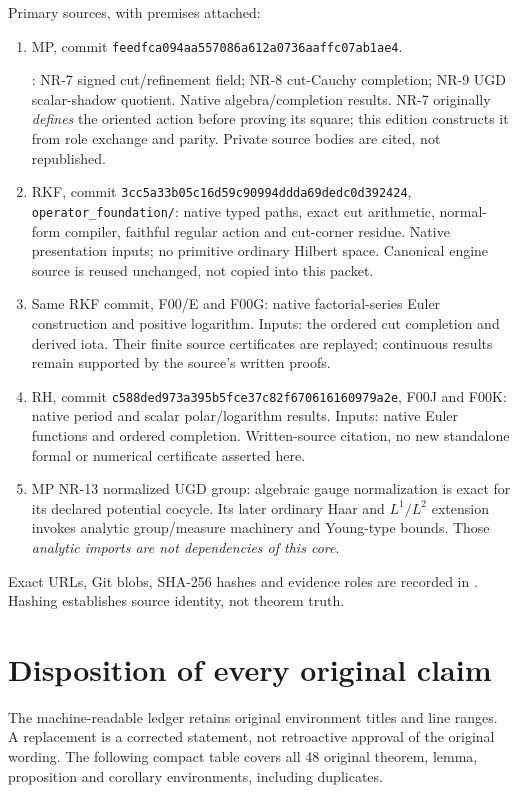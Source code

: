 \documentclass[11pt]{article}
\begin{document}
Primary sources, with premises attached:
\begin{enumerate}
\item MP, commit \texttt{feedfca094aa557086a612a0736aaffc07ab1ae4}.\par
{}: NR-7 signed cut/refinement
field; NR-8 cut-Cauchy completion; NR-9 UGD scalar-shadow quotient.
Native algebra/completion results. NR-7 originally \emph{defines} the
oriented action before proving its square; this edition constructs it from
role exchange and parity. Private source bodies are cited, not republished.
\item RKF, commit \texttt{3cc5a33b05c16d59c90994ddda69dedc0d392424},
\texttt{operator\_foundation/}: native typed paths, exact cut arithmetic,
normal-form compiler, faithful regular action and cut-corner residue.
Native presentation inputs; no primitive ordinary Hilbert space. Canonical
engine source is reused unchanged, not copied into this packet.
\item Same RKF commit, F00/E and F00G: native factorial-series Euler
construction and positive logarithm. Inputs: the ordered cut completion and
derived iota. Their finite source certificates are replayed; continuous
results remain supported by the source's written proofs.
\item RH, commit \texttt{c588ded973a395b5fce37c82f670616160979a2e}, F00J
and F00K: native period and scalar polar/logarithm results. Inputs: native
Euler functions and ordered completion. Written-source citation, no new
standalone formal or numerical certificate asserted here.
\item MP NR-13 normalized UGD group: algebraic gauge normalization is exact
for its declared potential cocycle. Its later ordinary Haar and $L^1/L^2$
extension invokes analytic group/measure machinery and Young-type bounds.
Those \emph{analytic imports are not dependencies of this core}.
\end{enumerate}
Exact URLs, Git blobs, SHA-256 hashes and evidence roles are recorded in
. Hashing establishes source identity,
not theorem truth.

\appendix
\section{Disposition of every original claim}
The machine-readable ledger retains original environment titles and line
ranges. A replacement is a corrected statement, not retroactive approval of
the original wording. The following compact table covers all 48 original
theorem, lemma, proposition and corollary environments, including duplicates.

\end{document}
